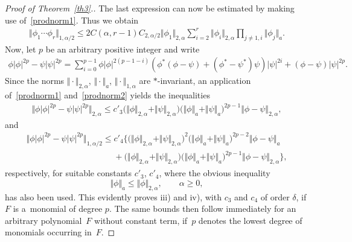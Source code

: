 \begin{proof}[Proof of Theorem~\ref{th3}.]
The last expression can now be estimated by making use of~\eqref{prodnorm1}. Thus we obtain
\begin{gather}\label{prodnorm2}
\Vert\phi_1\cdots\phi_r\Vert_{1,\alpha/2}
\leq 2 C(\alpha,r-1)C_{2,\alpha/2} \Vert\phi_1\Vert_{2,\alpha} \sum_{i=2}^r\Vert\phi_i\Vert_{2,\alpha}
\prod_{j\ne 1,i}\Vert\phi_j\Vert_a .
\end{gather}
Now, let $p$ be an arbitrary positive integer and write
\begin{gather*}
\phi |\phi|^{2p}-\psi |\psi|^{2p}
=\sum_{i=0}^{p-1}\phi |\phi|^{2(p-1-i)}
(\phi^* (\phi-\psi)+(\phi^*-\psi^*) \psi) |\psi|^{2i}
+(\phi-\psi) |\psi|^{2p} .
\end{gather*}
Since the norms $\Vert\cdot\Vert_{2,\alpha}$, $\Vert\cdot\Vert_a$, $\Vert\cdot\Vert_{1,\alpha}$
are  $*$-invariant, an application of~\eqref{prodnorm1}
and~\eqref{prodnorm2} yields the inequalities
\begin{gather*}
\Vert\phi |\phi|^{2p}-\psi |\psi|^{2p}\Vert_{2,\alpha}
\leq c'_3 \big(\Vert\phi\Vert_{2,\alpha}+\Vert\psi\Vert_{2,\alpha}\big)
\big(\Vert\phi\Vert_a+\Vert\psi\Vert_a\big)^{2p-1}\Vert\phi-\psi\Vert_{2,\alpha} ,
\end{gather*}
and
\begin{gather*}
 \Vert\phi |\phi|^{2p}-\psi |\psi|^{2p}\Vert_{1,\alpha/2}
 \leq c'_4
\Big\{\big(\Vert\phi\Vert_{2,\alpha}+\Vert\psi\Vert_{2,\alpha}\big)^2
\big(\Vert\phi\Vert_a+\Vert\psi\Vert_a\big)^{2p-2}\Vert\phi-\psi\Vert_a\\
\phantom{\Vert\phi |\phi|^{2p}-\psi |\psi|^{2p}\Vert_{1,\alpha/2}\leq}{}
+
\big(\Vert\phi\Vert_{2,\alpha}+\Vert\psi\Vert_{2,\alpha}\big)
\big(\Vert\phi\Vert_a+\Vert\psi\Vert_a\big)^{2p-1}\Vert\phi-\psi\Vert_{2,\alpha}\Big\} ,
\end{gather*}
respectively, for suitable constants $c'_3$, $c'_4$, where the
obvious inequality
\[
\Vert\phi\Vert_a \leq \Vert\phi\Vert_{2,\alpha} ,\qquad \alpha\geq 0 ,
\]
has also been used. This evidently proves iii) and iv), with $c_3$ and
$c_4$ of order $\delta$, if $F$ is a~monomial of degree $p$. The same bounds then follow immediately for an
arbitrary polynomial~$F$ without constant term, if~$p$ denotes the
lowest degree of monomials occurring in~$F$.
\end{proof}
